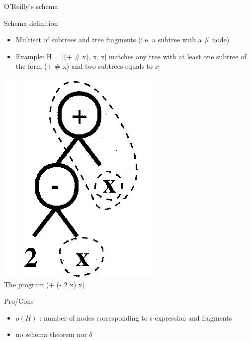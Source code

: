 \begin{frame}{O'Reilly's schema}
  \begin{block}{Schema definition}
    \begin{itemize}
      \item Multiset of subtrees and tree fragments (i.e. a subtree with a \# node)\cite{oreilly1994}
      \item Example: H = [(+ \# x), x, x] matches any tree with at least one subtree of the form (+ \# x) and two subtrees equals to $x$
    \end{itemize}
  \end{block}

  \begin{center}
    \includegraphics[scale=0.90]{img/schemar}\\
    The program (+ (- 2 x) x)
  \end{center}

    \begin{block}{Pro/Cons}
      \begin{itemize}
        \item<pro@1> $o(H)$ : number of nodes corresponding to s-expression and fragments
        \item<con@1> no schema theorem nor $\delta$
      \end{itemize}
    \end{block}

\end{frame}

